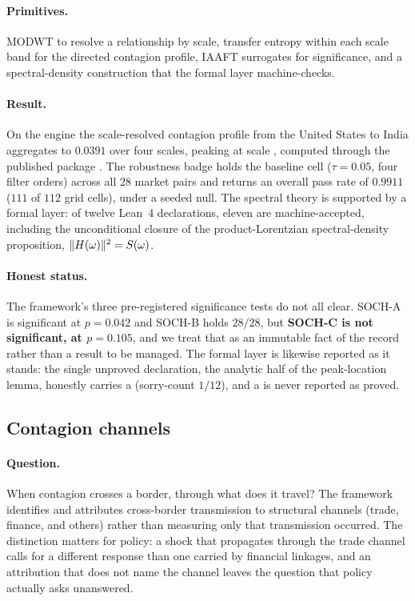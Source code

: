 \paragraph{Primitives.} MODWT to resolve a relationship by scale, transfer
entropy within each scale band for the directed contagion profile, IAAFT
surrogates for significance, and a spectral-density construction that the formal
layer machine-checks.

\paragraph{Result.} On the engine the scale-resolved contagion profile from the
United States to India aggregates to $0.0391$ over four scales, peaking at scale
, computed through the published  package
\citep{bhandari2026soch,sochpkg}. The robustness badge holds the baseline cell
($\tau=0.05$, four filter orders) across all $28$ market pairs and returns an
overall pass rate of $0.9911$ ($111$ of $112$ grid cells), under a seeded null.
The spectral theory is supported by a formal layer: of twelve Lean~4
declarations, eleven are machine-accepted, including the unconditional closure of
the product-Lorentzian spectral-density proposition,
$\lVert H(\omega) \rVert^2 = S(\omega)$.

\paragraph{Honest status.} The framework's three pre-registered significance
tests do not all clear. SOCH-A is significant at $p=0.042$ and SOCH-B holds
$28/28$, but \textbf{SOCH-C is not significant, at $p=0.105$}, and we treat that
as an immutable fact of the record rather than a result to be managed. The formal
layer is likewise reported as it stands: the single unproved declaration, the
analytic half of the peak-location lemma, honestly carries a 
(sorry-count $1/12$), and a  is never reported as proved.

\subsection{Contagion channels}
\label{sec:elem-channels}

\paragraph{Question.} When contagion crosses a border, through what does it
travel? The framework identifies and attributes cross-border transmission to
structural channels (trade, finance, and others) rather than measuring only that
transmission occurred. The distinction matters for policy: a shock that
propagates through the trade channel calls for a different response than one
carried by financial linkages, and an attribution that does not name the channel
leaves the question that policy actually asks unanswered.

